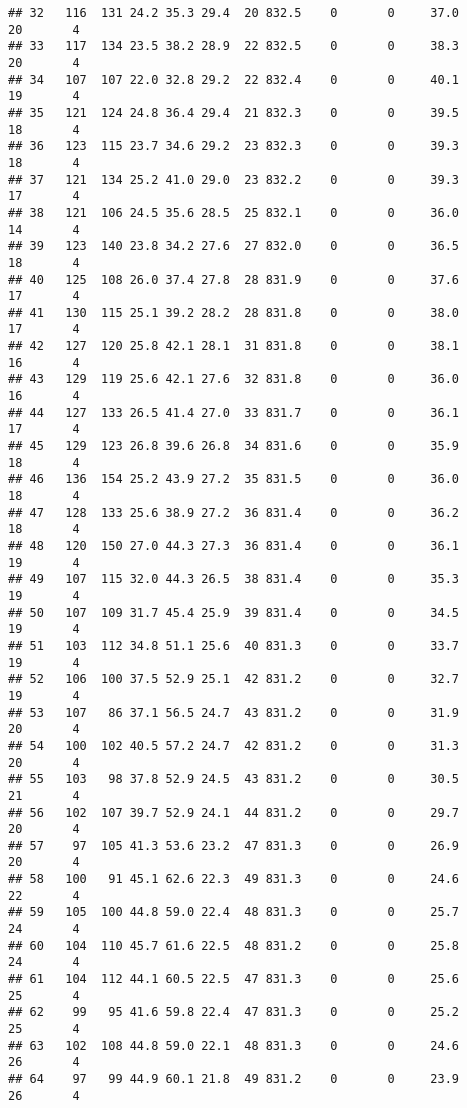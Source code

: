 \documentclass[
]{article}
\begin{document}
\begin{verbatim}
## 32   116  131 24.2 35.3 29.4  20 832.5    0       0     37.0      20       4
## 33   117  134 23.5 38.2 28.9  22 832.5    0       0     38.3      20       4
## 34   107  107 22.0 32.8 29.2  22 832.4    0       0     40.1      19       4
## 35   121  124 24.8 36.4 29.4  21 832.3    0       0     39.5      18       4
## 36   123  115 23.7 34.6 29.2  23 832.3    0       0     39.3      18       4
## 37   121  134 25.2 41.0 29.0  23 832.2    0       0     39.3      17       4
## 38   121  106 24.5 35.6 28.5  25 832.1    0       0     36.0      14       4
## 39   123  140 23.8 34.2 27.6  27 832.0    0       0     36.5      18       4
## 40   125  108 26.0 37.4 27.8  28 831.9    0       0     37.6      17       4
## 41   130  115 25.1 39.2 28.2  28 831.8    0       0     38.0      17       4
## 42   127  120 25.8 42.1 28.1  31 831.8    0       0     38.1      16       4
## 43   129  119 25.6 42.1 27.6  32 831.8    0       0     36.0      16       4
## 44   127  133 26.5 41.4 27.0  33 831.7    0       0     36.1      17       4
## 45   129  123 26.8 39.6 26.8  34 831.6    0       0     35.9      18       4
## 46   136  154 25.2 43.9 27.2  35 831.5    0       0     36.0      18       4
## 47   128  133 25.6 38.9 27.2  36 831.4    0       0     36.2      18       4
## 48   120  150 27.0 44.3 27.3  36 831.4    0       0     36.1      19       4
## 49   107  115 32.0 44.3 26.5  38 831.4    0       0     35.3      19       4
## 50   107  109 31.7 45.4 25.9  39 831.4    0       0     34.5      19       4
## 51   103  112 34.8 51.1 25.6  40 831.3    0       0     33.7      19       4
## 52   106  100 37.5 52.9 25.1  42 831.2    0       0     32.7      19       4
## 53   107   86 37.1 56.5 24.7  43 831.2    0       0     31.9      20       4
## 54   100  102 40.5 57.2 24.7  42 831.2    0       0     31.3      20       4
## 55   103   98 37.8 52.9 24.5  43 831.2    0       0     30.5      21       4
## 56   102  107 39.7 52.9 24.1  44 831.2    0       0     29.7      20       4
## 57    97  105 41.3 53.6 23.2  47 831.3    0       0     26.9      20       4
## 58   100   91 45.1 62.6 22.3  49 831.3    0       0     24.6      22       4
## 59   105  100 44.8 59.0 22.4  48 831.3    0       0     25.7      24       4
## 60   104  110 45.7 61.6 22.5  48 831.2    0       0     25.8      24       4
## 61   104  112 44.1 60.5 22.5  47 831.3    0       0     25.6      25       4
## 62    99   95 41.6 59.8 22.4  47 831.3    0       0     25.2      25       4
## 63   102  108 44.8 59.0 22.1  48 831.3    0       0     24.6      26       4
## 64    97   99 44.9 60.1 21.8  49 831.2    0       0     23.9      26       4

\end{verbatim}
\end{document}
